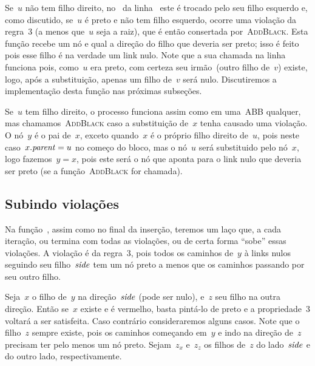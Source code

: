 \documentclass[../../main.tex]{subfiles}
\begin{document}
Se~$u$ não tem filho direito, no~ da linha~ este é trocado pelo seu filho esquerdo e, como discutido, se~$u$ é preto e não tem filho esquerdo, ocorre uma violação da regra~3 (a menos que~$u$ seja a raiz), que é então consertada por~\textsc{AddBlack}. Esta função recebe um nó e qual a direção do filho que deveria ser preto; isso é feito pois esse filho é na verdade um link nulo. Note que a sua chamada na linha~ funciona pois, como~$u$ era preto, com certeza seu irmão~(outro filho de~$v$) existe, logo, após a substituição, apenas um filho de~$v$ será nulo. Discutiremos a implementação desta função nas próximas subseções.

Se~$u$ tem filho direito, o processo funciona assim como em uma~ABB qualquer, mas chamamos~\textsc{AddBlack} caso a substituição de~$x$ tenha causado uma violação. O nó~$y$ é o pai de~$x$, exceto quando~$x$ é o próprio filho direito de~$u$, pois neste caso~${x.\mathit{parent} = u}$ no começo do bloco, mas o nó~$u$ será substituido pelo nó~$x$, logo fazemos~$y = x$, pois este será o nó que aponta para o link nulo que deveria ser preto (se a função~\textsc{AddBlack} for chamada).

\subsection{Subindo violações}

Na função~, assim como no final da inserção, teremos um laço que, a cada iteração, ou termina com todas as violações, ou de certa forma ``sobe'' essas violações. A violação é da regra~3, pois todos os caminhos de~$y$ à links nulos seguindo seu filho~$\mathit{side}$ tem um nó preto a menos que os caminhos passando por seu outro filho.

Seja~$x$ o filho de~$y$ na direção~$\mathit{side}$ (pode ser nulo), e~$z$ seu filho na outra direção. Então se~$x$ existe e é vermelho, basta pintá-lo de preto e a propriedade~3 voltará a ser satisfeita. Caso contrário consideraremos alguns casos. Note que o filho~$z$ sempre existe, pois os caminhos começando em~$y$ e indo na direção de~$z$ precisam ter pelo menos um nó preto. Sejam~$z_x$ e~$z_z$ os filhos de~$z$ do lado~$\mathit{side}$ e do outro lado, respectivamente.
\end{document}
